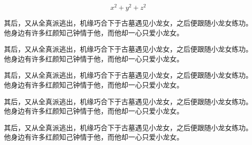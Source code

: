 \documentclass[doctor, vlined, ]{DissertUESTC}
\begin{document}
\begin{longtable}{p{2em} p{4.5em}}
	\end{longtable}
	

	\begin{equation}
		x^2 + y^2 + z^2
	\end{equation}
	


	\begin{definition}[名称]
		其后，又从全真派逃出，机缘巧合下于古墓遇见小龙女，之后便跟随小龙女练功。他身边有许多红颜知己钟情于他，而他却一心只爱小龙女。
	\end{definition}

	\begin{axiom}[名称]
		其后，又从全真派逃出，机缘巧合下于古墓遇见小龙女，之后便跟随小龙女练功。他身边有许多红颜知己钟情于他，而他却一心只爱小龙女。
	\end{axiom}
	
	\begin{theorem}[名称]
		其后，又从全真派逃出，机缘巧合下于古墓遇见小龙女，之后便跟随小龙女练功。他身边有许多红颜知己钟情于他，而他却一心只爱小龙女。
	\end{theorem}
	
	\begin{proposition}[名称]
		其后，又从全真派逃出，机缘巧合下于古墓遇见小龙女，之后便跟随小龙女练功。他身边有许多红颜知己钟情于他，而他却一心只爱小龙女。
	\end{proposition}
	
	\begin{corollary}[名称]
		其后，又从全真派逃出，机缘巧合下于古墓遇见小龙女，之后便跟随小龙女练功。他身边有许多红颜知己钟情于他，而他却一心只爱小龙女。
	\end{corollary}
	
\end{document}
